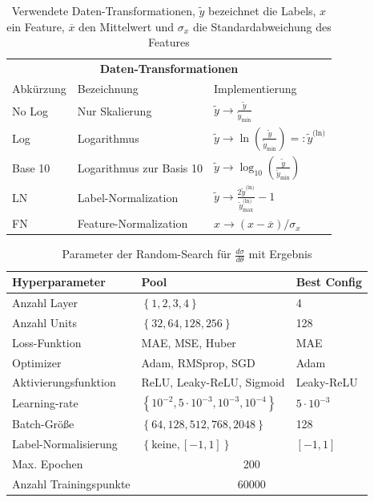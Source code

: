 \begin{table}
	\centering
	\begin{tabular}{lll}
		\multicolumn{3}{c}{\textbf{Daten-Transformationen}} \\[5pt]
		Abkürzung & Bezeichnung & Implementierung \\
		\hline
		No Log & Nur Skalierung & $\tilde{y} \rightarrow \frac{\tilde{y}}{\tilde{y}_{\text{min}}}$ \\
		Log & Logarithmus & $\tilde{y} \rightarrow \ln(\frac{\tilde{y}}{\tilde{y}_{\text{min}}}) =: \tilde{y}^{\text{(ln)}}$ \\
		Base 10 & Logarithmus zur Basis 10 & $\tilde{y} \rightarrow \log_{10}(\frac{\tilde{y}}{\tilde{y}_{\text{min}}})$ \\
		LN & Label-Normalization & $\tilde{y} \rightarrow \frac{2\tilde{y}^{\text{(ln)}}}{\tilde{y}^{\text{(ln)}}_{\text{max}}} - 1$\\
		FN\cite{FN} & Feature-Normalization & $x \rightarrow {(x - \overline{x})}/{\sigma_x}$
	\end{tabular}
	\caption{Verwendete Daten-Transformationen, $\tilde{y}$ bezeichnet die Labels, $x$ ein Feature, $\overline{x}$ den Mittelwert und $\sigma_x$ die Standardabweichung des Features}
	\label{mathe-daten-transformationen}
\end{table}
\begin{table}
	\centering
	\begin{tabular}{|l|l|l|}
		\hline
		Hyperparameter & Pool & Best Config \\
		\hline
		Anzahl Layer & $\left\lbrace 1, 2, 3, 4 \right\rbrace$ & 4 \\
		Anzahl Units & $\left\lbrace 32, 64, 128, 256\right\rbrace$ & 128 \\
		Loss-Funktion & MAE, MSE, Huber & MAE \\
		Optimizer & Adam, RMSprop, SGD  & Adam\\
		Aktivierungsfunktion & ReLU, Leaky-ReLU, Sigmoid & Leaky-ReLU \\
		Learning-rate & $\left\lbrace 10^{-2}, 5 \cdot 10^{-3}, 10^{-3}, 10^{-4} \right\rbrace $ & $5 \cdot 10^{-3}$\\
		Batch-Größe & $\left\lbrace 64, 128, 512, 768, 2048 \right\rbrace $ & 128\\
		Label-Normalisierung & $\left\lbrace \text{keine}, [-1,1]\right\rbrace $ & $[-1,1]$\\
		\hline
		Max. Epochen & \multicolumn{2}{c|}{200}\\
		Anzahl Trainingspunkte & \multicolumn{2}{c|}{60000} \\
		\hline
	\end{tabular}
	\caption{Parameter der Random-Search für $\frac{d\sigma}{d\theta}$ mit Ergebnis}
	\label{hyperparameter-theta}
\end{table}
